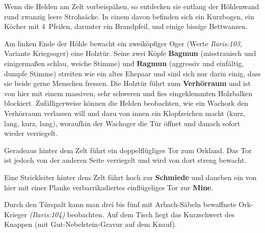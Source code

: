 Wenn die Helden am Zelt vorbeispähen, so entdecken sie entlang der Höhlenwand rund zwanzig leere Strohsäcke. In einem davon befinden sich ein Kurzbogen, ein Köcher mit 4~Pfeilen, darunter ein Brandpfeil, und einige bissige Bettwanzen.

Am linken Ende der Höhle bewacht ein zweiköpfiger Oger (Werte \emph{Ilaris:103}, Variante Kriegsoger) eine Holztür.
Seine zwei Köpfe \textbf{Bagmun} (misstrauisch und einigermaßen schlau, weiche Stimme) und \textbf{Ragmun} (aggressiv und einfältig, dumpfe Stimme) streiten wie ein altes Ehepaar und sind sich nur darin einig, dass sie beide gerne Menschen fressen.
Die Holztür führt zum \textbf{Verhörraum} und ist von hier mit einem massiven, sehr schweren und fies eingeklemmten Holzbalken blockiert.
Zufälligerweise können die Helden beobachten, wie ein Wachork den Verhörraum verlassen will und dazu von innen ein Klopfzeichen macht (kurz, lang, kurz, lang), woraufhin der Wachoger die Tür öffnet und danach sofort wieder verriegelt.


Geradeaus hinter dem Zelt führt ein doppelflügliges Tor zum Orkland.
Das Tor ist jedoch von der anderen Seite verriegelt und wird von dort streng bewacht.

Eine Strickleiter hinter dem Zelt führt hoch zur \textbf{Schmiede} und daneben ein von hier mit einer Planke verbarrikadiertes einflügeliges Tor zur \textbf{Mine}.



Durch den Türspalt kann man drei bis fünf mit Arbach-Säbeln bewaffnete Ork-Krieger \emph{(Ilaris:104)} beobachten. Auf dem Tisch liegt das Kurzschwert des Knappen (mit Gut-Nebelstein-Gravur auf dem Knauf).

